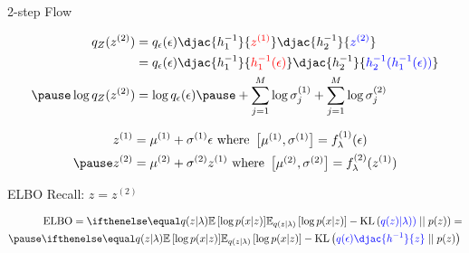 \documentclass[14pt]{beamer}
\begin{document}
\begin{frame}{2-step Flow}
\begin{small}
\begin{equation*}
\begin{aligned}
q_{Z}(z^{(2)}) &= q_{\epsilon}(\epsilon)\djac{h^{-1}_{1}}{\textcolor{red}{z^{(1)}}}\djac{h^{-1}_{2}}{\textcolor{blue}{z^{(2)}}} \\
&= q_{\epsilon}(\epsilon)\djac{h^{-1}_{1}}{\textcolor{red}{h^{-1}_{1}(\epsilon)}}\djac{h^{-1}_{2}}{\textcolor{blue}{h^{-1}_{2}(h^{-1}_{1}(\epsilon))}} \\ \pause
\log q_{Z}(z^{(2)}) &= \log q_{\epsilon}(\epsilon) \pause + \sum_{j=1}^{M}\log\sigma^{(1)}_{j} + \sum_{j=1}^{M}\log\sigma^{(2)}_{j}
\end{aligned}
\end{equation*}
\end{small}
\pause
\begin{equation*}
\begin{aligned}
z^{(1)} &= \mu^{(1)} + \sigma^{(1)}\epsilon \text{ where } \begin{bmatrix}\mu^{(1)}, \sigma^{(1)}\end{bmatrix} = f^{(1)}_{\lambda}(\epsilon) \\ \pause
z^{(2)} &= \mu^{(2)} + \sigma^{(2)}z^{(1)} \text{ where } \begin{bmatrix}\mu^{(2)}, \sigma^{(2)}\end{bmatrix} = f^{(2)}_{\lambda}(z^{(1)})
\end{aligned}
\end{equation*}
\end{frame}

\begin{frame}{ELBO}
Recall: $ z = z^{(2)} $
\begin{small}
\begin{equation*}
\begin{aligned}
&\ELBO = \E[q(z|\lambda)]{\log p(x|z)} - \KL{\textcolor{blue}{q(z)|\lambda))}}{p(z)} = \\ \pause
&\E[q(z|\lambda)]{\log p(x|z)} - \KL{\textcolor{blue}{q(\epsilon)\djac{h^{-1}}{z}}}{p(z)}
\end{aligned}
\end{equation*}
\end{small}
\end{frame}
\end{document}
